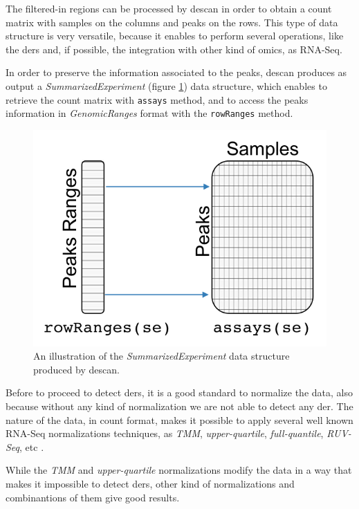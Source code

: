 The filtered-in regions can be processed by \gls{descan} in order to obtain a count matrix with samples on the columns and peaks on the rows.
This type of data structure is very versatile, because it enables to perform several operations, like the \glspl{der} and, if possible, the integration with other kind of omics, as RNA-Seq.

In order to preserve the information associated to the peaks, \gls{descan} produces as output a \textit{SummarizedExperiment} (figure \ref{fig:countsdescan}) data structure, which enables to retrieve the count matrix with \lstinline{assays} method, and to access the peaks information in \textit{GenomicRanges} format with the \lstinline{rowRanges} method. %

\begin{figure}[H]
\centering
\includegraphics[keepaspectratio]{img/descan2/counts.png}
\caption[\gls{descan} counts illustration]{An illustration of the \textit{SummarizedExperiment} data structure produced by \gls{descan}.}
\label{fig:countsdescan}
\centering
\end{figure}

Before to proceed to detect \glspl{der}, it is a good standard to normalize the data, also because without any kind of normalization we are not able to detect any \gls{der}.
The nature of the data, in count format, makes it possible to apply several well known RNA-Seq normalizations techniques, as \textit{TMM}, \textit{upper-quartile}, \textit{full-quantile}, \textit{RUV-Seq}, etc \cite{Risso2014, Robinson2010, Dillies2013}.

While the \textit{TMM} and \textit{upper-quartile} normalizations modify the data in a way that makes it impossible to detect \glspl{der}, other kind of normalizations and combinantions of them give good results.

